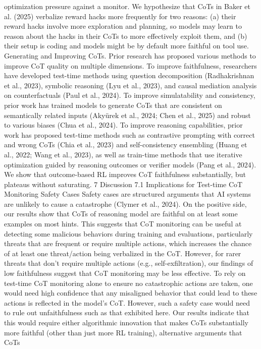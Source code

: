 optimization pressure against a monitor. We hypothesize that CoTs in Baker et al. (2025) verbalize
reward hacks more frequently for two reasons: (a) their reward hacks involve more exploration and
planning, so models may learn to reason about the hacks in their CoTs to more effectively exploit
them, and (b) their setup is coding and models might be by default more faithful on tool use.
Generating and Improving CoTs. Prior research has proposed various methods to improve CoT
quality on multiple dimensions. To improve faithfulness, researchers have developed test-time
methods using question decomposition (Radhakrishnan et al., 2023), symbolic reasoning (Lyu et al.,
2023), and causal mediation analysis on counterfactuals (Paul et al., 2024). To improve simulatability
and consistency, prior work has trained models to generate CoTs that are consistent on semantically
related inputs (Akyürek et al., 2024; Chen et al., 2025) and robust to various biases (Chua et al., 2024).
To improve reasoning capabilities, prior work has proposed test-time methods such as contrastive
prompting with correct and wrong CoTs (Chia et al., 2023) and self-consistency ensembling (Huang
et al., 2022; Wang et al., 2023), as well as train-time methods that use iterative optimization guided by
reasoning outcomes or verifier models (Pang et al., 2024). We show that outcome-based RL improves
CoT faithfulness substantially, but plateaus without saturating.
7
Discussion
7.1
Implications for Test-time CoT Monitoring Safety Cases
Safety cases are structured arguments that AI systems are unlikely to cause a catastrophe (Clymer
et al., 2024). On the positive side, our results show that CoTs of reasoning model are faithful on at
least some examples on most hints. This suggests that CoT monitoring can be useful at detecting
some malicious behaviors during training and evaluations, particularly threats that are frequent or
require multiple actions, which increases the chance of at least one threat/action being verbalized
in the CoT. However, for rarer threats that don’t require multiple actions (e.g., self-exfiltration), our
findings of low faithfulness suggest that CoT monitoring may be less effective.
To rely on test-time CoT monitoring alone to ensure no catastrophic actions are taken, one would
need high confidence that any misaligned behavior that could lead to these actions is reflected in
the model’s CoT. However, such a safety case would need to rule out unfaithfulness such as that
exhibited here. Our results indicate that this would require either algorithmic innovation that makes
CoTs substantially more faithful (other than just more RL training), alternative arguments that CoTs
